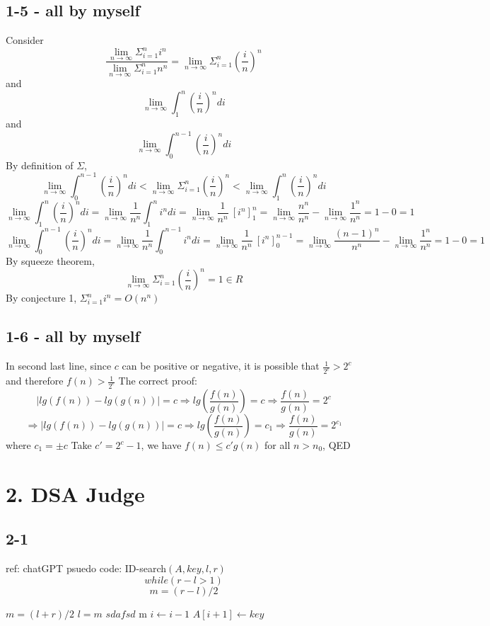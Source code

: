 \documentclass[12pt]{article}
\begin{document}
\subsection*{1-5 - all by myself}
Consider
\[\frac{\lim_{n \to \infty}{\Sigma_{i = 1}^{n}i^n}}{\lim_{n \to \infty}{\Sigma_{i = 1}^{n}n^n}} = \lim_{n \to \infty}{\Sigma_{i = 1}^{n}(\frac{i}{n})^n}\]
and
\[\lim_{n \to \infty}{\int^n_1(\frac{i}{n})^n di}\]
and
\[\lim_{n \to \infty}{\int^{n - 1}_0(\frac{i}{n})^n di}\]
By definition of $\Sigma$,
\[\lim_{n \to \infty}{\int^{n - 1}_0(\frac{i}{n})^n di}<\lim_{n \to \infty}{\Sigma_{i = 1}^{n}(\frac{i}{n})^n}<\lim_{n \to \infty}{\int^n_1(\frac{i}{n})^n di}\]
\[\lim_{n \to \infty}{\int^n_1(\frac{i}{n})^n di} = \lim_{n \to \infty}{\frac{1}{n^n}\int^n_1 i^n di} = \lim_{n \to \infty}{\frac{1}{n^n}\ \left[i^n\right]^n_1 }=\lim_{n \to \infty}{\frac{n^n}{n^n}}-\lim_{n \to \infty}{\frac{1^n}{n^n}}=1-0=1\]
\[\lim_{n \to \infty}{\int^{n-1}_0(\frac{i}{n})^n di} = \lim_{n \to \infty}{\frac{1}{n^n}\int^{n-1}_0 i^n di} = \lim_{n \to \infty}{\frac{1}{n^n}\ \left[i^n\right]^{n-1}_0 }=\lim_{n \to \infty}{\frac{(n-1)^n}{n^n}}-\lim_{n \to \infty}{\frac{1^n}{n^n}}=1-0=1\]
By squeeze theorem,
\[\lim_{n \to \infty}{\Sigma_{i = 1}^{n}(\frac{i}{n})^n} = 1\in R\]
By conjecture 1, ${\Sigma_{i = 1}^{n}i^n} = O(n^n)$

\subsection*{1-6 - all by myself}
In second last line, since $c$ can be positive or negative, it is possible that $\frac{1}{2^c}>2^c$ and therefore $f(n)> \frac{1}{2^c}$\newline
The correct proof:
\[|lg(f(n))-lg(g(n))|=c\Rightarrow lg(\frac{f(n)}{g(n)}) = c \Rightarrow\frac{f(n)}{g(n)}=2^c\]
\[\Rightarrow |lg(f(n))-lg(g(n))|=c\Rightarrow lg(\frac{f(n)}{g(n)}) = c_1 \Rightarrow\frac{f(n)}{g(n)}=2^{c_1}\]
where $c_1 = \pm c$\newline
Take $c' = 2^c-1$, we have $f(n)\leq c'g(n)$ for all $n > n_0$, QED\newpage

\section*{2. DSA Judge}
\subsection*{2-1}
ref: chatGPT
psuedo code:
ID-search$(A, key, l, r)$
\[while(r - l > 1)\]
\[m = (r - l) / 2\]
\begin{algorithmic}
    \State $m = (l + r)/2$
    \State $l=m$
    \State $sdafsd$
    \Else
    \State\Return m
    \EndIf
    \State $i \gets i-1$
    \EndWhile
    \State $A[i+1] \gets key$
    \EndProcedure
\end{algorithmic}
\end{document}
